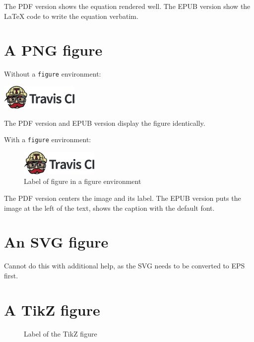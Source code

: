 \documentclass[ebook,12pt,oneside,openany]{memoir}
\begin{document}
The PDF version shows the equation rendered well.
The EPUB version show the LaTeX code to write the equation verbatim. 

\section{A PNG figure}

Without a \verb;figure; environment:

\includegraphics[scale=1.0]{TravisCI.png}

The PDF version and EPUB version display the figure identically.

With a \verb;figure; environment:
	
\begin{figure}[H]
  \centering
  \includegraphics[scale=1.0]{TravisCI.png}
  \caption{Label of figure in a figure environment}
  \label{fig:png}
\end{figure}

The PDF version centers the image and its label.
The EPUB version puts the image at the left of the text, shows the caption with the default font.

\section{An SVG figure}

Cannot do this with additional help, as the SVG needs to be converted to EPS first.

\section{A TikZ figure}

\begin{figure}[H]
  \centering
  \caption{Label of the TikZ figure}
  \label{fig:tikz}
\end{figure}
\end{document}
